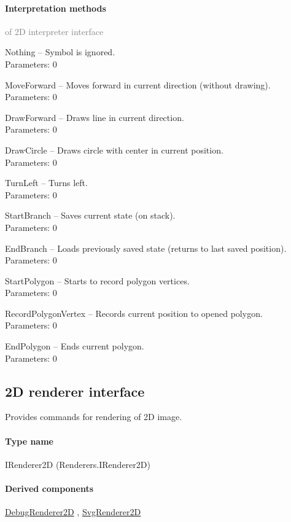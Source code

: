 	\paragraph{Interpretation methods}\textcolor{gray}{of 2D interpreter interface}
	\begin{description*}
		\item[Nothing]
			-- Symbol is ignored.
		\\ Parameters: 0 
		\item[MoveForward]
			-- Moves forward in current direction (without drawing).
		\\ Parameters: 0 
		\item[DrawForward]
			-- Draws line in current direction.
		\\ Parameters: 0 
		\item[DrawCircle]
			-- Draws circle with center in current position.
		\\ Parameters: 0 
		\item[TurnLeft]
			-- Turns left.
		\\ Parameters: 0 
		\item[StartBranch]
			-- Saves current state (on stack).
		\\ Parameters: 0 
		\item[EndBranch]
			-- Loads previously saved state (returns to last saved position).
		\\ Parameters: 0 
		\item[StartPolygon]
			-- Starts to record polygon vertices.
		\\ Parameters: 0 
		\item[RecordPolygonVertex]
			-- Records current position to opened polygon.
		\\ Parameters: 0 
		\item[EndPolygon]
			-- Ends current polygon.
		\\ Parameters: 0 
	\end{description*}
	

\subsection{2D renderer interface}
\label{Malsys.Processing.Components.Renderers.IRenderer2D}
Provides commands for rendering of 2D image.\paragraph{Type name}
IRenderer2D (Renderers.IRenderer2D) 	\paragraph{Derived components}
		\hyperref[Malsys.Processing.Components.Renderers.DebugRenderer2D]{DebugRenderer2D}%
, 		\hyperref[Malsys.Processing.Components.Renderers.SvgRenderer2D]{SvgRenderer2D}%
